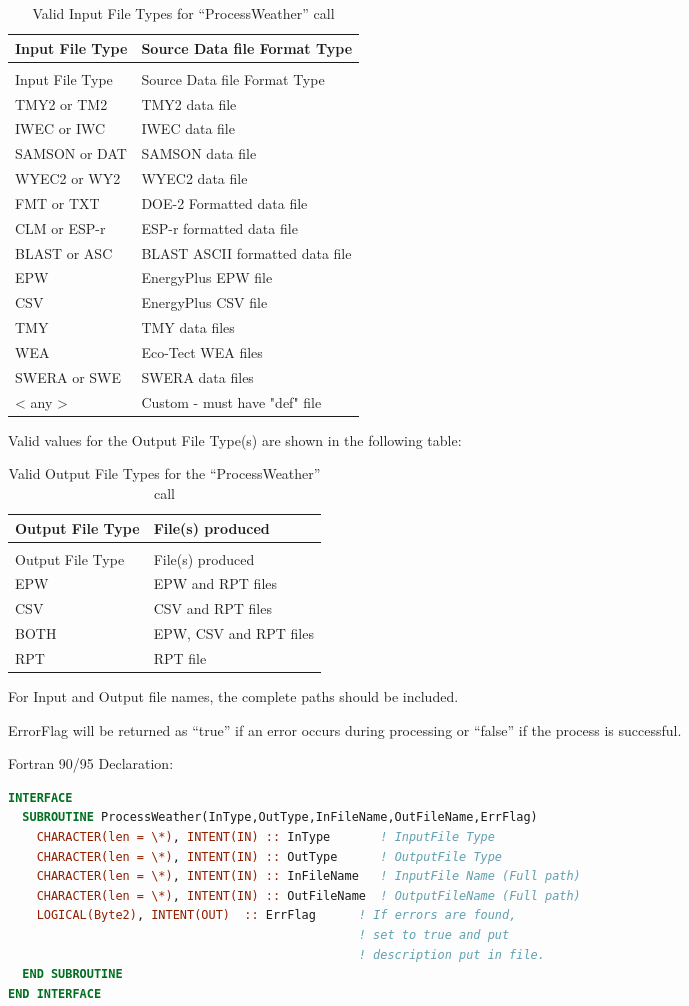 \begin{longtable}[c]{@{}ll@{}}
\caption{Valid Input File Types for ``ProcessWeather'' call \label{table:valid-input-file-types-for-processweather}} \tabularnewline
\toprule 
Input File Type & Source Data file Format Type \tabularnewline
\midrule
\endfirsthead

\caption[]{Valid Input File Types for ``ProcessWeather'' call} \tabularnewline
\toprule 
Input File Type & Source Data file Format Type \tabularnewline
\midrule
\endhead

TMY2 or TM2 & TMY2 data file \tabularnewline
IWEC or IWC & IWEC data file \tabularnewline
SAMSON or DAT & SAMSON data file \tabularnewline
WYEC2 or WY2 & WYEC2 data file \tabularnewline
FMT or TXT & DOE-2 Formatted data file \tabularnewline
CLM or ESP-r & ESP-r formatted data file \tabularnewline
BLAST or ASC & BLAST ASCII formatted data file \tabularnewline
EPW & EnergyPlus EPW file \tabularnewline
CSV & EnergyPlus CSV file \tabularnewline
TMY & TMY data files \tabularnewline
WEA & Eco-Tect WEA files \tabularnewline
SWERA or SWE & SWERA data files \tabularnewline
< any > & Custom - must have "def" file \tabularnewline
\bottomrule
\end{longtable}

Valid values for the Output File Type(s) are shown in the following table:

\begin{longtable}[c]{@{}ll@{}}
\caption{Valid Output File Types for the ``ProcessWeather'' call \label{table:valid-output-file-types-for}} \tabularnewline
\toprule 
Output File Type & File(s) produced \tabularnewline
\midrule
\endfirsthead

\caption[]{Valid Output File Types for the ``ProcessWeather'' call} \tabularnewline
\toprule 
Output File Type & File(s) produced \tabularnewline
\midrule
\endhead

EPW & EPW and RPT files \tabularnewline
CSV & CSV and RPT files \tabularnewline
BOTH & EPW, CSV and RPT files \tabularnewline
RPT & RPT file \tabularnewline
\bottomrule
\end{longtable}

For Input and Output file names, the complete paths should be included.

ErrorFlag will be returned as ``true'' if an error occurs during processing or ``false'' if the process is successful.

Fortran 90/95 Declaration:

\begin{lstlisting}[language=Fortran]
INTERFACE
  SUBROUTINE ProcessWeather(InType,OutType,InFileName,OutFileName,ErrFlag)
    CHARACTER(len = \*), INTENT(IN) :: InType       ! InputFile Type
    CHARACTER(len = \*), INTENT(IN) :: OutType      ! OutputFile Type
    CHARACTER(len = \*), INTENT(IN) :: InFileName   ! InputFile Name (Full path)
    CHARACTER(len = \*), INTENT(IN) :: OutFileName  ! OutputFileName (Full path)
    LOGICAL(Byte2), INTENT(OUT)  :: ErrFlag      ! If errors are found,
                                                 ! set to true and put
                                                 ! description put in file.
  END SUBROUTINE
END INTERFACE
\end{lstlisting}

